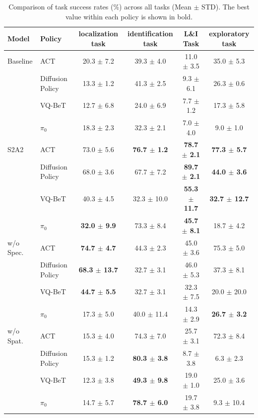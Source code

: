 \documentclass{article}
\begin{document}
	\begin{table}[t]
		\centering
		\scriptsize
		\setlength{\tabcolsep}{4pt}
		\caption{
			Comparison of task success rates (\%) across all tasks (Mean $\pm$ STD). The best value within each policy is shown in bold.
			}
		\label{tab:results}
		\begin{tabular}{llcccc}
			\hline
			Model & Policy & localization task & identification task & L\&I Task & exploratory task \\
			\hline
			Baseline & ACT & 20.3 $\pm$ 7.2 & 39.3 $\pm$ 4.0 & 11.0 $\pm$ 3.5 & 35.0 $\pm$ 5.3 \\
			 & Diffusion Policy & 13.3 $\pm$ 1.2 & 41.3 $\pm$ 2.5 & 9.3 $\pm$ 6.1 & 26.3 $\pm$ 0.6 \\
			 & VQ-BeT & 12.7 $\pm$ 6.8 & 24.0 $\pm$ 6.9 & 7.7 $\pm$ 1.2 & 17.3 $\pm$ 5.8 \\
			 & $\pi_0$ & 18.3 $\pm$ 2.3 & 32.3 $\pm$ 2.1 & 7.0 $\pm$ 4.0 & 9.0 $\pm$ 1.0 \\
			\hline
			S2A2 & ACT & 73.0 $\pm$ 5.6 & \textbf{76.7 $\pm$ 1.2} & \textbf{78.7 $\pm$ 2.1} & \textbf{77.3 $\pm$ 5.7} \\
			 & Diffusion Policy & 68.0 $\pm$ 3.6 & 67.7 $\pm$ 7.2 & \textbf{89.7 $\pm$ 2.1} & \textbf{44.0 $\pm$ 3.6} \\
			 & VQ-BeT & 40.3 $\pm$ 4.5 & 32.3 $\pm$ 10.0 & \textbf{55.3 $\pm$ 11.7} & \textbf{32.7 $\pm$ 12.7} \\
			 & $\pi_0$ & \textbf{32.0 $\pm$ 9.9} & 73.3 $\pm$ 8.4 & \textbf{45.7 $\pm$ 8.1} & 18.7 $\pm$ 4.2 \\
			\hline
			w/o Spec. & ACT & \textbf{74.7 $\pm$ 4.7} & 44.3 $\pm$ 2.3 & 45.0 $\pm$ 3.6 & 75.3 $\pm$ 5.0 \\
			 & Diffusion Policy & \textbf{68.3 $\pm$ 13.7} & 32.7 $\pm$ 3.1 & 46.0 $\pm$ 5.3 & 37.3 $\pm$ 8.1 \\
			 & VQ-BeT & \textbf{44.7 $\pm$ 5.5} & 32.7 $\pm$ 3.1 & 32.3 $\pm$ 7.5 & 20.0 $\pm$ 20.0 \\
			 & $\pi_0$ & 17.3 $\pm$ 5.0 & 40.0 $\pm$ 11.4 & 14.3 $\pm$ 2.9 & \textbf{26.7 $\pm$ 3.2} \\
			\hline
			w/o Spat. & ACT & 15.3 $\pm$ 4.0 & 74.3 $\pm$ 7.0 & 25.7 $\pm$ 3.1 & 72.3 $\pm$ 8.4 \\
			 & Diffusion Policy & 15.3 $\pm$ 1.2 & \textbf{80.3 $\pm$ 3.8} & 8.7 $\pm$ 3.8 & 6.3 $\pm$ 2.3 \\
			 & VQ-BeT & 12.3 $\pm$ 3.8 & \textbf{49.3 $\pm$ 9.8} & 19.0 $\pm$ 1.0 & 25.0 $\pm$ 3.6 \\
			 & $\pi_0$ & 14.7 $\pm$ 5.7 & \textbf{78.7 $\pm$ 6.0} & 19.7 $\pm$ 3.8 & 9.3 $\pm$ 10.4 \\
			\hline
		\end{tabular}
	\end{table}
\end{document}

